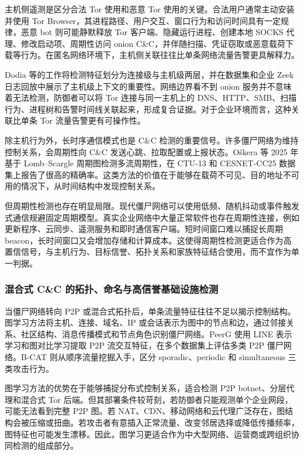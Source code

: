 主机侧遥测是区分合法 Tor 使用和恶意 Tor 使用的关键。合法用户通常主动安装并使用 Tor Browser，其进程路径、用户交互、窗口行为和访问时间具有一定规律，恶意 bot 则可能静默释放 Tor 客户端、隐藏运行进程、创建本地 SOCKS 代理、修改启动项、周期性访问 onion C\&C，并伴随扫描、凭证窃取或恶意载荷下载等行为。在匿名网络环境下，主机侧关联往往比单条网络流量告警更具解释力。

Dodia 等的工作将检测特征划分为连接级与主机级两层，并在数据集和企业 Zeek 日志回放中展示了主机级上下文的重要性\cite{dodia2022exposing}。网络边界看不到 onion 服务并不意味着无法检测，防御者可以将 Tor 连接与同一主机上的 DNS、HTTP、SMB、扫描行为、进程树和告警时间线关联起来，形成复合证据。对于企业环境而言，这种关联比单条 Tor 流量告警更有可操作性。

除主机行为外，长时序通信模式也是 C\&C 检测的重要信号。许多僵尸网络为维持控制关系，会周期性向 C\&C 发送心跳、拉取配置或上报状态。O\v{s}kera 等 2025 年基于 Lomb--Scargle 周期图检测多流周期性，在 CTU-13 和 CESNET-CC25 数据集上报告了很高的精确率\cite{oskera2025periodic}。这类方法的价值在于能够在载荷不可见、目的地址不可用的情况下，从时间结构中发现控制关系。

但周期性检测也存在明显局限。现代僵尸网络可以使用低频、随机抖动或事件触发式通信规避固定周期模型。真实企业网络中大量正常软件也存在周期性连接，例如更新程序、云同步、遥测服务和即时通信客户端。短时间窗口难以捕捉长周期 beacon，长时间窗口又会增加存储和计算成本。这使得周期性检测更适合作为高置信信号，与主机行为、目标信誉、拓扑关系和家族特征结合使用，而不宜作为单一判据。

\subsubsection{混合式 C\&C 的拓扑、命名与高信誉基础设施检测}

当僵尸网络转向 P2P 或混合式拓扑后，单条流量特征往往不足以揭示控制结构。图学习方法将主机、连接、域名、IP 或会话表示为图中的节点和边，通过邻接关系、社区结构、消息传播模式和节点角色识别僵尸网络。PeerG 使用 LINE 表示学习和图对比学习提取 P2P 流交互特征，在多个数据集上评估多类 P2P 僵尸网络\cite{wu2024peerg}。B-CAT 则从顺序流量挖掘入手，区分 sporadic、periodic 和 simultaneous 三类攻击行为\cite{putra2024bcat}。

图学习方法的优势在于能够捕捉分布式控制关系，适合检测 P2P botnet、分层代理和混合式 Tor 后端。但其部署条件较苛刻，若防御者只能观测单个企业网段，可能无法看到完整 P2P 图。若 NAT、CDN、移动网络和云代理广泛存在，图结构会被压缩或扭曲。若攻击者有意插入正常流量、改变邻居选择或降低传播频率，图特征也可能发生漂移。因此，图学习更适合作为中大型网络、运营商或跨组织协同检测的组成部分。

